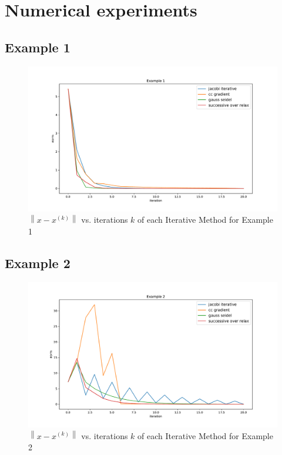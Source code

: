 \documentclass[11pt]{article}	%
\newcommand\norm[1]{\left\lVert#1\right\rVert}
\begin{document}
\section{Numerical experiments}
\subsection{Example 1}
\begin{figure}[H]
\centering
\includegraphics[width=.9\textwidth]{1}
\caption{$\norm{x - x^{(k)}}$ vs. iterations $k$ of each Iterative Method for Example 1}
\label{fig:1}
\end{figure}

\subsection{Example 2}
\begin{figure}[H]
\centering
\includegraphics[width=.9\textwidth]{2}
\caption{$\norm{x - x^{(k)}}$ vs. iterations $k$ of each Iterative Method for Example 2}
\label{fig:2}
\end{figure}
\end{document}
